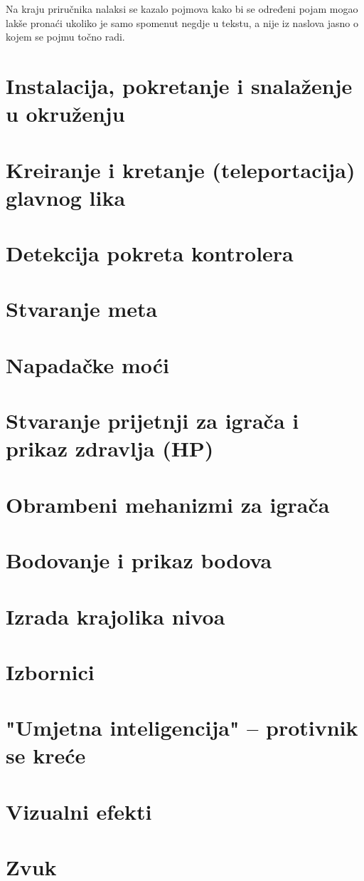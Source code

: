 \documentclass[a4paper,10pt]{article}
\begin{document}
Na kraju priručnika nalaksi se kazalo pojmova kako bi se određeni pojam mogao
lakše pronaći ukoliko je samo spomenut negdje u tekstu, a nije iz naslova jasno
o kojem se pojmu točno radi.

\pagebreak


\section{Instalacija, pokretanje i snalaženje u okruženju }

\pagebreak
\section{Kreiranje i kretanje (teleportacija) glavnog lika}

\pagebreak
\section{Detekcija pokreta kontrolera}

\pagebreak
\section{Stvaranje meta}

\pagebreak
\section{Napadačke moći}

\pagebreak
\section{Stvaranje prijetnji za igrača i prikaz zdravlja (HP)}

\pagebreak
\section{Obrambeni mehanizmi za igrača}

\pagebreak
\section{Bodovanje i prikaz bodova}

\pagebreak
\section{Izrada krajolika nivoa}

\pagebreak
\section{Izbornici}

\pagebreak
\section{"Umjetna inteligencija" -- protivnik se kreće}

\pagebreak
\section{Vizualni efekti}

\pagebreak
\section{Zvuk}

\printindex
\end{document}
